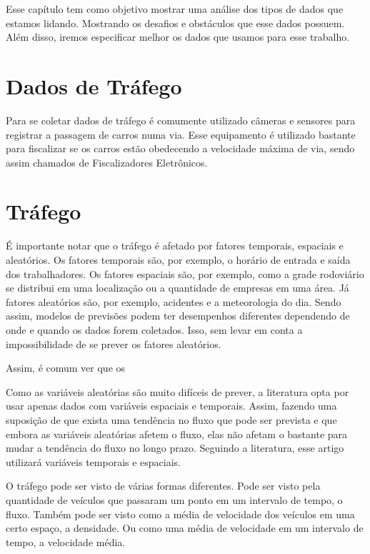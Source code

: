 Esse capítulo tem como objetivo mostrar uma análise dos tipos de dados que estamos lidando. Mostrando os desafios e obstáculos que esse dados possuem. Além disso, iremos especificar melhor os dados que usamos para esse trabalho.

\section{Dados de Tráfego}

Para se coletar dados de tráfego é comumente utilizado câmeras e sensores para registrar a passagem de carros numa via. Esse equipamento é utilizado bastante para fiscalizar se os carros estão obedecendo a velocidade máxima de via, sendo assim chamados de Fiscalizadores Eletrônicos.

\section{Tráfego}

É importante notar que o tráfego é afetado por fatores temporais, espaciais e aleatórios. Os fatores temporais são, por exemplo, o horário de entrada e saída dos trabalhadores. Os fatores espaciais são, por exemplo, como a grade rodoviário se distribui em uma localização ou a quantidade de empresas em uma área. Já fatores aleatórios são, por exemplo, acidentes e a meteorologia do dia. Sendo assim, modelos de previsões podem ter desempenhos diferentes dependendo de onde e quando os dados forem coletados. Isso, sem levar em conta a impossibilidade de se prever os fatores aleatórios.

Assim, é comum ver que os 



Como as variáveis aleatórias são muito difíceis de prever, a literatura opta por usar apenas dados com variáveis espaciais e temporais. Assim, fazendo uma suposição de que exista uma tendência no fluxo que pode ser prevista e que embora as variáveis aleatórias afetem o fluxo, elas não afetam o bastante para mudar a tendência do fluxo no longo prazo. Seguindo a literatura, esse artigo utilizará variáveis temporais e espaciais.

O tráfego pode ser visto de várias formas diferentes. Pode ser visto pela quantidade de veículos que passaram um ponto em um intervalo de tempo, o fluxo. Também pode ser visto como a média de velocidade dos veículos em uma certo espaço, a densidade. Ou como uma média de velocidade em um intervalo de tempo, a velocidade média.

